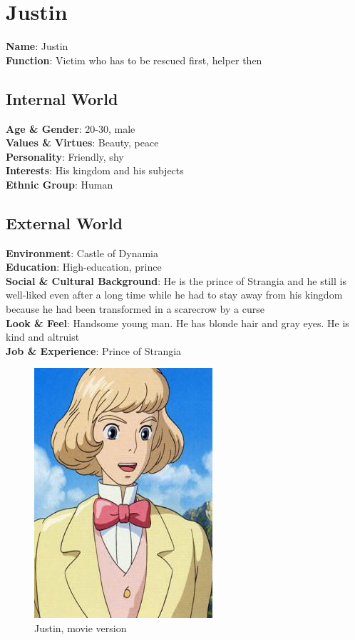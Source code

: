 \section{Justin}

\begin{minipage}{0.5\textwidth}
\textbf{Name}: Justin \\
\textbf{Function}: Victim who has to be rescued first, helper then

\subsection{Internal World}

\textbf{Age \& Gender}: 20-30, male \\
\textbf{Values \& Virtues}: Beauty, peace \\
\textbf{Personality}: Friendly, shy \\
\textbf{Interests}: His kingdom and his subjects \\
\textbf{Ethnic Group}: Human

\subsection{External World}
\textbf{Environment}: Castle of Dynamia \\
\textbf{Education}: High-education, prince \\
\textbf{Social \& Cultural Background}: He is the prince of Strangia and he still is well-liked even after a long time while he had to stay away from his kingdom because he had been transformed in a scarecrow by a curse \\
\textbf{Look \& Feel}: Handsome young man. He has blonde hair and gray eyes. He is kind and altruist \\
\textbf{Job \& Experience}: Prince of Strangia \\

\end{minipage}%
%
\hfill\begin{minipage}{0.4\textwidth}
  \begin{figure}[H]
  \includegraphics{Images/Characters/justin_portrait}
  \caption{Justin, movie version }
\end{figure}
\end{minipage}

